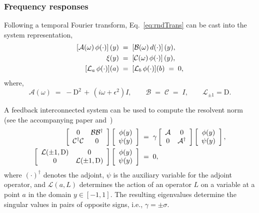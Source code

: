\documentclass[%
secnumarabic,%
 amssymb, amsmath,%
 aps,prf,superscriptaddress,longbibliography
frontmatterverbose,
]{revtex4-2}
\begin{document}
\subsubsection{Frequency responses}

Following a temporal Fourier transform, Eq.~\eqref{eq:rndTrans} can be cast into the system representation,
\begin{align}
    \left[\mathcal A(\omega)\,\phi(\cdot)\right] (y) \;&=\; \left[\mathcal B(\omega)\, d(\cdot)\right](y),\notag\\
    \xi (y)\;&=\; \left[\mathcal C(\omega)\,\phi(\cdot)\right](y),\label{eq:mot1c}\\
    [\mathcal{L}_a \, \phi(\cdot)](a)  \;&=\; [\mathcal{L}_b \, \phi(\cdot)](b) \;=\;  0,\notag
  \end{align}  
where,
$$
	\mathcal A (\omega)\;=\;  - \mathrm D^2 \, + \, (i\omega + \epsilon^2) I,
	\qquad
	\mathcal B \;=\; \mathcal C \;=\; I,\qquad \mathcal {L}_{\pm 1} = \mathrm D.
$$

A feedback interconnected system can be used to compute the resolvent norm (see the accompanying paper and~\cite{Boyd1989})
  \begin{align}
\left[
\begin{array}{cc}
  0 &\mathcal{B}\mathcal{B}^{\dagger} \\
   \mathcal{C}^{\dagger}\mathcal{C}&0
\end{array} \right] \left[ \begin{array}{c}
   \phi(y)\\
   \psi(y)
\end{array} \right]   
\;&=\; 
\gamma 
\left[\begin{array}{cc}
  \mathcal{A} & 0\\
  0 & \mathcal{A}^{\dagger}
\end{array}\right]\left[ \begin{array}{c}
   \phi(y)\\
   \psi(y)
\end{array} \right], \label{eq:feedback}\\
\left[\begin{array}{cc}
\mathcal{L}(\pm 1,\mathrm D) & 0\\
0 & \mathcal{L}(\pm 1,\mathrm D) 
\end{array}\right]\left[ \begin{array}{c}
   \phi(y)\\
   \psi(y)
\end{array} \right] \;&=\; 0, \notag
\end{align}
where $(\cdot)^{\dagger}$ denotes the adjoint, $ \psi$ is the auxiliary variable for the adjoint operator, and $\mathcal{L} (a,L)$ determines the action of an operator $L$ on a variable at a point $a$ in the domain $y \in [-1,1]$. The resulting eigenvalues determine the singular values in pairs of opposite signs, i.e., $\gamma = \pm \sigma$.
\end{document}
